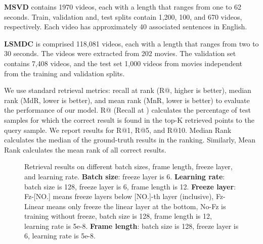 \documentclass[11pt]{article}
\begin{document}
    \noindent
	\textbf{MSVD} \cite{chen2011collecting} contains 1970 videos, each with a length that ranges from one to 62 seconds. Train, validation and, test splits contain 1,200, 100, and 670 videos, respectively. Each video has approximately 40 associated sentences in English.

	\noindent
	\textbf{LSMDC} \cite{Rohrbach2015LSMDC} is comprised 118,081 videos, each with a length that ranges from two to 30 seconds. The videos were extracted from 202 movies. The validation set contains 7,408 videos, and the test set 1,000 videos from movies independent from the training and validation splits.

	We use standard retrieval metrics: recall at rank  (R@, higher is better), median rank (MdR, lower is better), and mean rank (MnR, lower is better) to evaluate the performance of our model. R@ (Recall at ) calculates the percentage of test samples for which the correct result is found in the top-K retrieved points to the query sample. We report results for R@1, R@5, and R@10. Median Rank calculates the median of the ground-truth results in the ranking. Similarly, Mean Rank calculates the mean rank of all correct results.
	\begin{figure*}[tbp]
		\centering
		\caption{Retrieval results on different batch sizes, frame length, freeze layer, and learning rate. \textbf{Batch size}: freeze layer is 6. \textbf{Learning rate}: batch size is 128, freeze layer is 6, frame length is 12. \textbf{Freeze layer}: Fz-[NO.] means freeze layers below [NO.]-th layer (inclusive), Fz-Linear means only freeze the linear layer at the bottom, No-Fz is training without freeze, batch size is 128, frame length is 12, learning rate is 5e-8. \textbf{Frame length}: batch size is 128, freeze layer is 6, learning rate is 5e-8.}\label{fig_study_sdy_fig}
	\end{figure*}
\end{document}
